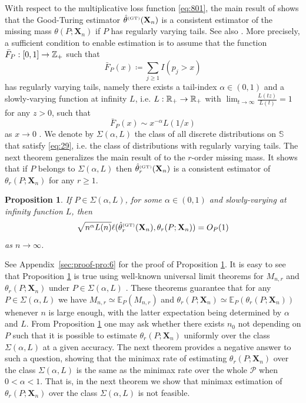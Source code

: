 \documentclass{article}
\newtheorem{proposition}{Proposition}
\newcommand{\1}{\boldsymbol{1}}
\newcommand{\EE}{\mathbb{E}}
\theoremstyle{plain}
\begin{document}
With respect to the multiplicative loss function \eqref{eq:801}, the main result of \cite{Oha(12)} shows that the Good-Turing estimator $\hat{\theta}^{\text{\tiny{(GT)}}}(\mathbf{X}_{n})$ is a consistent estimator of the missing mass $\theta(P;\mathbf{X}_{n})$ if $P$ has regularly varying tails. See also \cite{Mos(15)}. More precisely, a sufficient condition to enable estimation is to assume that the function $\bar{F}_P : [0,1] \to \mathbb{Z}_{+}$ such that
\begin{displaymath}
  \bar{F}_P(x) \coloneqq \sum_{j\geq 1}I(p_j > x)
\end{displaymath}
has regularly varying tails, namely there exists a tail-index $\alpha \in (0,1)$ and a slowly-varying function at infinity $L$, i.e.  $L : \mathbb{R}_{+} \to \mathbb{R}_{+}$ with $\lim_{t \to \infty} \frac{L(tz)}{L(t)} = 1$ for any $z>0$, such that
\begin{equation}
  \label{eq:29}
  \bar{F}_P(x) \sim x^{-\alpha}L(1/x)
\end{equation}
as $x \to 0$  \cite{Bin(87),Gne(07)}. We denote by $\Sigma(\alpha,L)$ the class of all discrete distributions on $\mathbb{S}$ that satisfy \eqref{eq:29}, i.e. the class of distributions with regularly varying tails. The next theorem generalizes the main result of \cite{Oha(12)} to the $r$-order missing mass. It shows that if $P$ belongs to $\Sigma(\alpha,L)$ then $\hat{\theta}_{r}^{\text{\tiny{(GT)}}}(\mathbf{X}_{n})$ is a consistent estimator of $\theta_{r}(P;\mathbf{X}_{n})$ for any $r\geq1$.

\begin{proposition}
  \label{pro:6}
  If $P \in \Sigma(\alpha,L)$, for some $\alpha \in (0,1)$ and slowly-varying at infinity function $L$, then
  \begin{displaymath}
    \sqrt{n^{\alpha}L(n)}\ell(\hat{\theta}_{r}^{\text{\tiny{(GT)}}}(\mathbf{X}_{n}),\theta_r(P;\mathbf{X}_n)) = O_P(1)
  \end{displaymath}
  as $n\to \infty$.
\end{proposition}

See Appendix~\ref{sec:proof-pro:6} for the proof of Proposition \ref{pro:6}. It is easy to see that Proposition \ref{pro:6} is true using well-known universal limit theorems for $M_{n,r}$ and $\theta_r(P;\mathbf{X}_n)$ under $P \in \Sigma(\alpha,L)$ \cite{Kar(67),Gne(07)}. These theorems guarantee that for any $P \in \Sigma(\alpha,L)$ we have $M_{n,r} \simeq \EE_P(M_{n,r})$ and $\theta_r(P;\mathbf{X}_n) \simeq \EE_P(\theta_r(P;\mathbf{X}_n))$ whenever $n$ is large enough, with the latter expectation being determined by $\alpha$ and $L$. From Proposition \ref{pro:6} one may ask whether there exists $n_{0}$ not depending on $P$ such that it is possible to estimate $\theta_r(P;\mathbf{X}_n)$ uniformly over the class $\Sigma(\alpha,L)$ at a given accuracy. The next theorem provides a negative answer to such a question, showing that the minimax rate of estimating $\theta_r(P;\mathbf{X}_n)$ over the class $\Sigma(\alpha,L)$ is the same as the minimax rate over the whole $\mathcal{P}$ when $0 < \alpha < 1$. That is, in the next theorem we show that minimax estimation of $\theta_r(P;\mathbf{X}_{n})$ over the class $\Sigma(\alpha,L)$ is not feasible.
\end{document}
